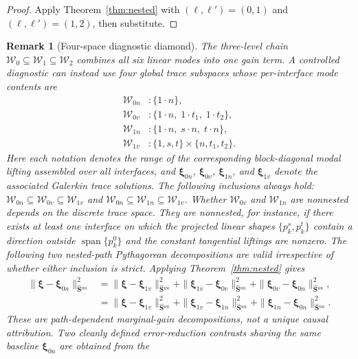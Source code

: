 \documentclass[11pt,a4paper]{article}
\newtheorem{remark}[theorem]{Remark}
\theoremstyle{definition}
\newcommand{\Schur}{\mathbf{S}}
\newcommand{\Shatuu}{\widehat{\Schur}{}^{uu}}
\newcommand{\Wspace}{\mathcal{W}}
\begin{document}
\begin{proof}
  Apply Theorem~\ref{thm:nested} with $(\ell,\ell')=(0,1)$ and
  $(\ell,\ell')=(1,2)$, then substitute.
\end{proof}

\begin{remark}[Four-space diagnostic diamond]\label{rem:four-space}
  The three-level chain $\Wspace_0\subseteq\Wspace_1\subseteq\Wspace_2$
  combines all six linear modes into one gain term.  A controlled
  diagnostic can instead use four global trace subspaces whose
  per-interface mode contents are
  \begin{align*}
    \Wspace_{0n} &: \{1\cdot n\},\\
    \Wspace_{0v} &: \{1\cdot n,\;1\cdot t_1,\;1\cdot t_2\},\\
    \Wspace_{1n} &: \{1\cdot n,\;s\cdot n,\;t\cdot n\},\\
    \Wspace_{1v} &: \{1,s,t\}\times\{n,t_1,t_2\}.
  \end{align*}
  Here each notation denotes the range of the corresponding
  block-diagonal modal lifting assembled over all interfaces, and
  $\bm{\xi}_{0n}$, $\bm{\xi}_{0v}$, $\bm{\xi}_{1n}$, and
  $\bm{\xi}_{1v}$ denote the associated Galerkin trace solutions.
  The following inclusions always hold:
  $\Wspace_{0n}\subseteq\Wspace_{0v}\subseteq\Wspace_{1v}$
  and
  $\Wspace_{0n}\subseteq\Wspace_{1n}\subseteq\Wspace_{1v}$.
  Whether $\Wspace_{0v}$ and $\Wspace_{1n}$ are nonnested depends on
  the discrete trace space.  They are nonnested, for instance, if there
  exists at least one interface on which the projected linear shapes
  $\{p_k^s,p_k^t\}$ contain a direction outside
  $\operatorname{span}\{p_k^0\}$ and the constant tangential liftings are
  nonzero.  The following two nested-path Pythagorean decompositions are
  valid irrespective of whether either inclusion is strict.  Applying
  Theorem~\ref{thm:nested} gives
  \[
  \begin{aligned}
  \|\bm{\xi}-\bm{\xi}_{0n}\|_{\Shatuu}^2
  &= \|\bm{\xi}-\bm{\xi}_{1v}\|_{\Shatuu}^2
   + \|\bm{\xi}_{1v}-\bm{\xi}_{0v}\|_{\Shatuu}^2
   + \|\bm{\xi}_{0v}-\bm{\xi}_{0n}\|_{\Shatuu}^2,\\
  &= \|\bm{\xi}-\bm{\xi}_{1v}\|_{\Shatuu}^2
   + \|\bm{\xi}_{1v}-\bm{\xi}_{1n}\|_{\Shatuu}^2
   + \|\bm{\xi}_{1n}-\bm{\xi}_{0n}\|_{\Shatuu}^2.
  \end{aligned}
  \]
  These are path-dependent marginal-gain decompositions, not a unique
  causal attribution.  Two cleanly defined error-reduction contrasts
  sharing the same baseline $\bm{\xi}_{0n}$ are obtained from the

\end{remark}
\end{document}
